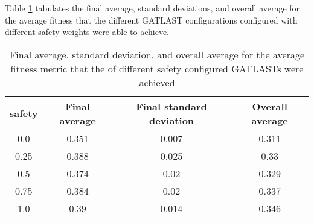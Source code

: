 Table \ref{tab:HP:GA:Safety:average fitness} tabulates the final average, standard deviations, and overall average for the average fitness that the different GATLAST configurations configured with different safety weights were able to achieve.
\begin{table}[tbh!]
\centering
\begin{adjustbox}{trim=0cm 0cm 0cm 0cm, clip=true}
\begin{tabular}{|c|c|c|c|}
\hline
safety & Final average & Final standard deviation & Overall average\\
\hline
0.0 & 0.351 & 0.007 & 0.311\\\hline
0.25 & 0.388 & 0.025 & 0.33\\\hline
0.5 & 0.374 & 0.02 & 0.329\\\hline
0.75 & 0.384 & 0.02 & 0.337\\\hline
1.0 & 0.39 & 0.014 & 0.346\\\hline
\end{tabular}
\end{adjustbox}
\caption{Final average, standard deviation, and overall average for the average fitness metric that the of different safety configured GATLASTs were achieved}
\label{tab:HP:GA:Safety:average fitness}
\end{table}